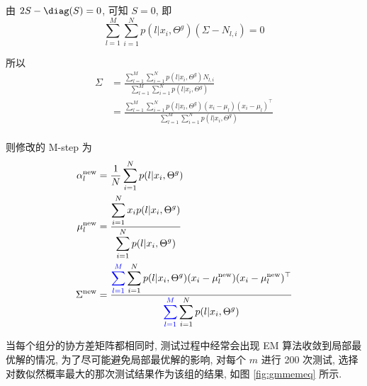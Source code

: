 \documentclass[openany]{ctexbook}
\theoremstyle{kaiti}
\theoremstyle{normal}
\begin{document}
由 $2S-\diag(S)=0$, 可知 $S=0$, 即
\begin{equation}
  \sum_{l=1}^M\sum_{i=1}^Np(l|x_i,\Theta^g)(\Sigma-N_{l,i})=0
\end{equation}

所以
\begin{equation}
  \begin{aligned}
    \Sigma
    &=\frac{\displaystyle\sum_{l=1}^M\sum_{i=1}^Np(l|x_i,\Theta^g)N_{l,i}}{\displaystyle\sum_{l=1}^M\sum_{i=1}^Np(l|x_i,\Theta^g)}\\
    &=\frac{\displaystyle\sum_{l=1}^M\sum_{i=1}^Np(l|x_i,\Theta^g)(x_i-\mu_l)(x_i-\mu_l)^{\top}}{\displaystyle\sum_{l=1}^M\sum_{i=1}^Np(l|x_i,\Theta^g)}\\
  \end{aligned}
\end{equation}

则修改的 M-step 为
\begin{equation}
  \begin{aligned}
    \alpha_l^{\mathrm{new}}&=\frac{1}{N}\sum_{i=1}^Np(l|x_i,\Theta^g)\\
    \mu_l^{\mathrm{new}}&=\frac{\displaystyle\sum_{i=1}^Nx_ip(l|x_i,\Theta^g)}{\displaystyle\sum_{i=1}^Np(l|x_i,\Theta^g)}\\
    \Sigma^{\mathrm{new}}&=\frac{\displaystyle{\color{blue}\sum_{l=1}^M}\sum_{i=1}^Np(l|x_i,\Theta^g)(x_i-\mu_l^{\mathrm{new}})(x_i-\mu_l^{\mathrm{new}})^{\top}}{\displaystyle{\color{blue}\sum_{l=1}^M}\sum_{i=1}^Np(l|x_i,\Theta^g)}\\
  \end{aligned}
\end{equation}

当每个组分的协方差矩阵都相同时, 测试过程中经常会出现 EM 算法收敛到局部最优解的情况, 为了尽可能避免局部最优解的影响, 对每个 $m$ 进行 200 次测试, 选择对数似然概率最大的那次测试结果作为该组的结果, 如图 \ref{fig:gmmemeq} 所示.
\end{document}
